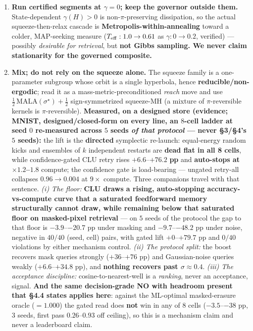 \documentclass[11pt]{article}
\begin{document}
\begin{enumerate}\itemsep1pt
\item \textbf{Run certified segments at $\gamma=0$; keep the governor outside them.} State-dependent $\gamma(H)>0$ is non-$\pi$-preserving dissipation, so the actual squeeze-then-relax cascade is \textbf{Metropolis-within-annealing} toward a colder, MAP-seeking measure ($T_{\rm eff}:1.0\to0.61$ as $\gamma:0\to0.2$, verified) --- possibly \emph{desirable for retrieval}, but \textbf{not Gibbs sampling. We never claim stationarity for the governed composite.}
\item \textbf{Mix; do not rely on the squeeze alone.} The squeeze family is a one-parameter subgroup whose orbit is a single hyperbola, hence \textbf{reducible/non-ergodic}; read it as a mass-metric-preconditioned \emph{reach} move and use $\tfrac12\,\mathrm{MALA}(\sigma^\star)+\tfrac12$ sign-symmetrized squeeze-MH (a mixture of $\pi$-reversible kernels is $\pi$-reversible). \textbf{Measured, on a designed store (evidence; MNIST, designed/closed-form on every line, an $8$-cell ladder at seed $0$ re-measured across $5$ seeds \emph{of that protocol} --- never \S3/\S4's $5$ seeds):} the lift is the \textbf{directed} symplectic re-launch: equal-energy random kicks and ensembles of $k$ independent restarts are \textbf{dead flat in all 8 cells}, while confidence-gated CLU retry rises $\mathbf{+6.6}$--$\mathbf{+76.2}$ \textbf{pp} and \textbf{auto-stops at $\times1.2$--$1.8$} compute; the confidence gate is load-bearing --- ungated retry-all collapses $0.96\to0.004$ at $9\times$ compute. Three companions travel with that sentence. \emph{(i) The floor:} \textbf{CLU draws a rising, auto-stopping accuracy-vs-compute curve that a saturated feedforward memory structurally cannot draw, while remaining below that saturated floor on masked-pixel retrieval} --- on $5$ seeds of the protocol the gap to that floor is $-3.9$--$-20.7$ pp under masking and $-9.7$--$-48.2$ pp under noise, negative in $40/40$ (seed, cell) pairs, with gated lift $+0$--$+79.7$ pp and $0/40$ violations by either mechanism control. \emph{(ii) The protocol split:} the boost recovers mask queries strongly ($+36$--$+76$ pp) and Gaussian-noise queries weakly ($+6.6$--$+34.8$ pp), and \textbf{nothing recovers past $\sigma\approx0.4$}. \emph{(iii) The acceptance discipline:} cosine-to-nearest-well is a \emph{ranking}, never an acceptance, signal. \textbf{And the same decision-grade NO with headroom present that \S4.4 states applies here}: against the ML-optimal masked-erasure oracle ($=1.000$) the gated read does \textbf{not} win in any of $8$ cells ($-3.5$--$-38$ pp, $3$ seeds, first pass $0.26$--$0.93$ off ceiling), so this is a mechanism claim and never a leaderboard claim.

\end{enumerate}
\end{document}
